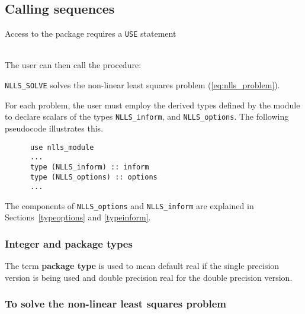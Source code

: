 \documentclass{spec}
\begin{document}
\newpage
\hslhowto

\subsection{Calling sequences}

Access to the package requires a {\tt USE} statement \\ \\
\indent\hspace{5mm}{\tt use ral\_nlls\_double}
\medskip

\noindent The user can then call the procedure:
\vspace{-0.1cm}
\begin{description}
\item {\tt NLLS\_SOLVE}  solves the non-linear least squares problem (\ref{eq:nlls_problem}).
\end{description}


\hsltypes
\label{derived types}
For each problem, the user must employ the derived types defined by the
module to declare scalars of the types {\tt NLLS\_inform}, and
{\tt NLLS\_options}.
The following pseudocode illustrates this.
\begin{verbatim}
      use nlls_module
      ...
      type (NLLS_inform) :: inform
      type (NLLS_options) :: options
      ...
\end{verbatim}
The components of {\tt NLLS\_options} and {\tt NLLS\_inform} are explained
in Sections~\ref{typeoptions} and \ref{typeinform}.


\hslarguments

\subsubsection{Integer and package types}
The term {\bf package type} is used to mean
default real if the single precision version is being used and
double precision real for the double precision version.

\subsubsection{To solve the non-linear least squares problem}
\label{sec:solve}
\end{document}
